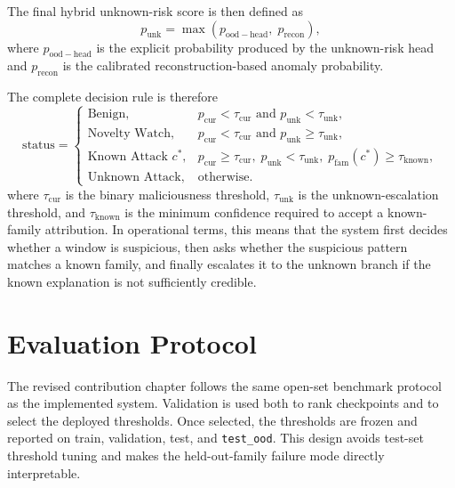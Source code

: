 \documentclass[12pt, a4paper]{report}
\begin{document}
The final hybrid unknown-risk score is then defined as
\begin{equation}
p_{\mathrm{unk}} = \max\left(p_{\mathrm{ood-head}},\; p_{\mathrm{recon}}\right),
\end{equation}
where $p_{\mathrm{ood-head}}$ is the explicit probability produced by the unknown-risk head and $p_{\mathrm{recon}}$ is the calibrated reconstruction-based anomaly probability.

The complete decision rule is therefore
\begin{equation}
\text{status}=
\begin{cases}
\text{Benign}, & p_{\mathrm{cur}} < \tau_{\mathrm{cur}} \text{ and } p_{\mathrm{unk}} < \tau_{\mathrm{unk}}, \\
\text{Novelty Watch}, & p_{\mathrm{cur}} < \tau_{\mathrm{cur}} \text{ and } p_{\mathrm{unk}} \ge \tau_{\mathrm{unk}}, \\
\text{Known Attack } c^*, & p_{\mathrm{cur}} \ge \tau_{\mathrm{cur}},\; p_{\mathrm{unk}} < \tau_{\mathrm{unk}},\; p_{\mathrm{fam}}(c^*) \ge \tau_{\mathrm{known}}, \\
\text{Unknown Attack}, & \text{otherwise.}
\end{cases}
\end{equation}
where $\tau_{\mathrm{cur}}$ is the binary maliciousness threshold, $\tau_{\mathrm{unk}}$ is the unknown-escalation threshold, and $\tau_{\mathrm{known}}$ is the minimum confidence required to accept a known-family attribution. In operational terms, this means that the system first decides whether a window is suspicious, then asks whether the suspicious pattern matches a known family, and finally escalates it to the unknown branch if the known explanation is not sufficiently credible.

\section{Evaluation Protocol}

The revised contribution chapter follows the same open-set benchmark protocol as the implemented system. Validation is used both to rank checkpoints and to select the deployed thresholds. Once selected, the thresholds are frozen and reported on train, validation, test, and \texttt{test\_ood}. This design avoids test-set threshold tuning and makes the held-out-family failure mode directly interpretable.
\end{document}
